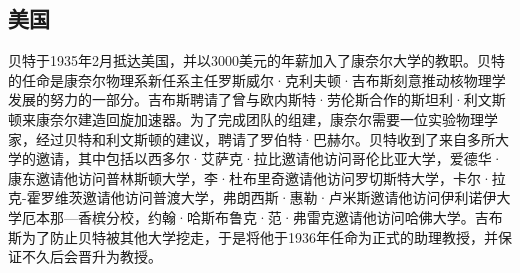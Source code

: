 \subsection{美国}  
贝特于1935年2月抵达美国，并以3000美元的年薪加入了康奈尔大学的教职。贝特的任命是康奈尔物理系新任系主任罗斯威尔·克利夫顿·吉布斯刻意推动核物理学发展的努力的一部分。吉布斯聘请了曾与欧内斯特·劳伦斯合作的斯坦利·利文斯顿来康奈尔建造回旋加速器。为了完成团队的组建，康奈尔需要一位实验物理学家，经过贝特和利文斯顿的建议，聘请了罗伯特·巴赫尔。贝特收到了来自多所大学的邀请，其中包括以西多尔·艾萨克·拉比邀请他访问哥伦比亚大学，爱德华·康东邀请他访问普林斯顿大学，李·杜布里奇邀请他访问罗切斯特大学，卡尔·拉克-霍罗维茨邀请他访问普渡大学，弗朗西斯·惠勒·卢米斯邀请他访问伊利诺伊大学厄本那—香槟分校，约翰·哈斯布鲁克·范·弗雷克邀请他访问哈佛大学。吉布斯为了防止贝特被其他大学挖走，于是将他于1936年任命为正式的助理教授，并保证不久后会晋升为教授。